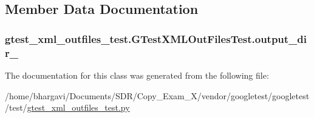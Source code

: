 \subsection{Member Data Documentation}
\subsubsection[{\texorpdfstring{output\+\_\+dir\+\_\+}{output_dir_}}]{\setlength{\rightskip}{0pt plus 5cm}gtest\+\_\+xml\+\_\+outfiles\+\_\+test.\+G\+Test\+X\+M\+L\+Out\+Files\+Test.\+output\+\_\+dir\+\_\+}\hypertarget{classgtest__xml__outfiles__test_1_1_g_test_x_m_l_out_files_test_aa5c31cd97047bc1d3060f4d27bc956a4}{}\label{classgtest__xml__outfiles__test_1_1_g_test_x_m_l_out_files_test_aa5c31cd97047bc1d3060f4d27bc956a4}


The documentation for this class was generated from the following file\+:\begin{DoxyCompactItemize}
\item 
/home/bhargavi/\+Documents/\+S\+D\+R/\+Copy\+\_\+\+Exam\+\_\+X/vendor/googletest/googletest/test/\hyperlink{gtest__xml__outfiles__test_8py}{gtest\+\_\+xml\+\_\+outfiles\+\_\+test.\+py}\end{DoxyCompactItemize}
